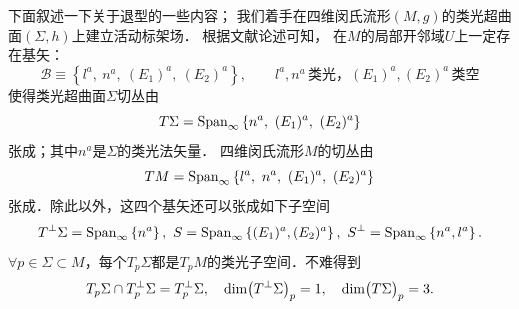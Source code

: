%    
%

下面叙述一下关于退型的一些内容；
我们着手在四维闵氏流形$(M,g)$的类光超曲面$(\Sigma,h)$上建立活动标架场．
根据文献\parencite[p.90-92]{Duggal-Bejancu-1996}论述可知，
在$M$的局部开邻域$U$上一定存在基矢：
\begin{equation}\label{chnull:eqn_bases}
    \mathcal{B} \equiv \left\{ l^a, \  n^a,
    \   (E_1)^a,\  (E_2)^a \right\} , \qquad
    l^a, n^a \, \text{类光，} (E_1)^a, (E_2)^a\, \text{类空}
\end{equation}
使得类光超曲面$\Sigma$切丛由
\begin{equation}\label{chnull:eqn_SigmaAll}
    T\Sigma={\rm Span}_{\infty}\left\{ n^a, \   (E_1)^a,\   (E_2)^a \right\}
\end{equation}
张成；其中$n^a$是$\Sigma$的类光法矢量．
四维闵氏流形$M$的切丛由
\begin{equation}
    TM={\rm Span}_{\infty}\left\{ l^a,  \   n^a, \   (E_1)^a,\   (E_2)^a \right\}
\end{equation}
张成．除此以外，这四个基矢还可以张成如下子空间
\begin{equation*}
    T^\perp\Sigma={\rm Span}_{\infty} \left\{ n^a \right\},\
    S={\rm Span}_{\infty}\left\{  (E_1)^a,  (E_2)^a \right\},\
    S^\perp={\rm Span}_{\infty}\left\{ n^a,  l^a \right\} . 
\end{equation*} %
$\forall p\in \Sigma \subset M$，每个$T_p\Sigma$都是$T_pM$的类光子空间．不难得到
\begin{equation}
    T_p\Sigma \cap T_p^\perp \Sigma = T_p^\perp\Sigma,\quad 
    {\rm dim}\bigl(T^\perp \Sigma\bigr)_p =1,
    \quad {\rm dim}\bigl(T \Sigma\bigr)_p =3.
\end{equation}



